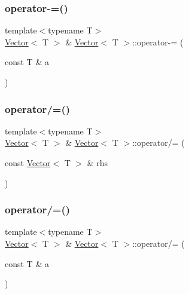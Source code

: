 \mbox{\label{classVector_a7581aba7a67b45ff1b2848d37e00cfa1}} 
\subsubsection{\texorpdfstring{operator-\/=()}{operator-=()}\hspace{0.1cm}{\footnotesize\ttfamily [2/2]}}
{\footnotesize\ttfamily template$<$typename T$>$ \\
\mbox{\hyperlink{classVector}{Vector}}$<$ T $>$ \& \mbox{\hyperlink{classVector}{Vector}}$<$ T $>$\+::operator-\/= (\begin{DoxyParamCaption}\item[{const T \&}]{a }\end{DoxyParamCaption})\hspace{0.3cm}{\ttfamily [inline]}}

\mbox{\label{classVector_adbf519ce5d68eb131947137e30596dc1}} 
\subsubsection{\texorpdfstring{operator/=()}{operator/=()}\hspace{0.1cm}{\footnotesize\ttfamily [1/2]}}
{\footnotesize\ttfamily template$<$typename T$>$ \\
\mbox{\hyperlink{classVector}{Vector}}$<$ T $>$ \& \mbox{\hyperlink{classVector}{Vector}}$<$ T $>$\+::operator/= (\begin{DoxyParamCaption}\item[{const \mbox{\hyperlink{classVector}{Vector}}$<$ T $>$ \&}]{rhs }\end{DoxyParamCaption})\hspace{0.3cm}{\ttfamily [inline]}}

\mbox{\label{classVector_a358eca4649d02b3bbab359484eb93140}} 
\subsubsection{\texorpdfstring{operator/=()}{operator/=()}\hspace{0.1cm}{\footnotesize\ttfamily [2/2]}}
{\footnotesize\ttfamily template$<$typename T$>$ \\
\mbox{\hyperlink{classVector}{Vector}}$<$ T $>$ \& \mbox{\hyperlink{classVector}{Vector}}$<$ T $>$\+::operator/= (\begin{DoxyParamCaption}\item[{const T \&}]{a }\end{DoxyParamCaption})\hspace{0.3cm}{\ttfamily [inline]}}


